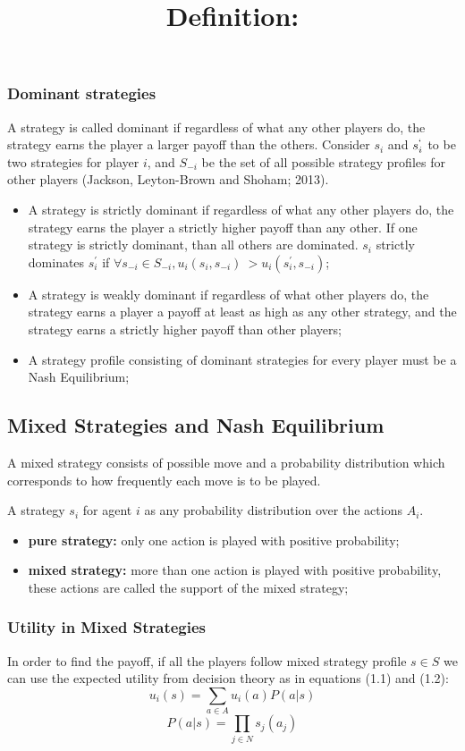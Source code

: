 \subsubsection{Dominant strategies}
A strategy is called dominant if regardless of what any other players do, the strategy earns the player a larger payoff than the others. Consider $s_i$ and $s_i^`$ to be two strategies for player $i$, and $S_{-i}$ be the set of all possible strategy profiles for other players (Jackson, Leyton-Brown and Shoham; 2013).
\begin{itemize}
\item A strategy is strictly dominant if regardless of what any other players do, the strategy earns the player a strictly higher payoff than any other. If one strategy is strictly dominant, than all others are dominated. $s_i$ strictly dominates $s^\prime_{i}$ if $\forall s_{-i} \in S_{-i}, u_i(s_i, s_{-i}) \>> u_i(s^\prime_{i}, s_{-i})$;
\item A strategy is weakly dominant if regardless of what other players do, the strategy earns a player a payoff at least as high as any other strategy, and the strategy earns a strictly higher payoff than other players;
\item A strategy profile consisting of dominant strategies for every player must be a Nash Equilibrium;
\end{itemize}

\subsection{Mixed Strategies and Nash Equilibrium}
A mixed strategy consists of possible move and a probability distribution which corresponds to how frequently each move is to be played.
\title{\textbf{Definition:}}
A strategy $s_i$ for agent $i$ as any probability distribution over the actions $A_i$.
\begin{itemize}
\item \textbf{pure strategy:} only one action is played with positive probability;
\item \textbf{mixed strategy:} more than one action is played with positive probability, these actions are called the support of the mixed strategy;
\end{itemize}

\subsubsection{Utility in Mixed Strategies}
In order to find the payoff, if all the players follow mixed strategy profile $s \in S$ we can use the expected utility from decision theory as in equations (1.1) and (1.2): 
\begin{equation} \label{eq:112}
u_i(s) = \sum_{a \in A}u_i(a)P(a|s)
\end{equation}
\begin{equation} 
P(a|s) = \prod_{j \in N}s_j(a_j)
\end{equation}
